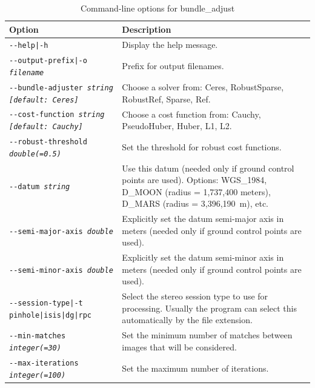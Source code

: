 \begin{longtable}{|l|p{7.5cm}|}
\caption{Command-line options for bundle\_adjust}
\label{tbl:bundleadjust}
\endfirsthead
\endhead
\endfoot
\endlastfoot
\hline
Option & Description \\ \hline \hline
\texttt{-\/-help|-h} & Display the help message. \\ \hline

\texttt{-\/-output-prefix|-o \textit{filename}} & Prefix for output filenames. \\ \hline

\texttt{-\/-bundle-adjuster \textit{string [default: Ceres]}} & Choose a solver from:
Ceres, RobustSparse, RobustRef, Sparse, Ref. \\ \hline

\texttt{-\/-cost-function \textit{string [default: Cauchy]}} & Choose a cost function
from: Cauchy, PseudoHuber, Huber, L1, L2. \\ \hline

\texttt{-\/-robust-threshold \textit{double(=0.5)}} & Set the threshold for robust
cost functions.\\ \hline

\texttt{-\/-datum \textit{string}} & Use this datum (needed only if ground control
points are used). Options: WGS\_1984, D\_MOON (radius = 1,737,400 meters), D\_MARS
(radius = 3,396,190~m), etc.  \\ \hline

\texttt{-\/-semi-major-axis \textit{double}} & Explicitly set the datum semi-major axis
in meters (needed only if ground control points are used).\\ \hline
\texttt{-\/-semi-minor-axis \textit{double}} & Explicitly set the datum semi-minor axis
in meters (needed only if ground control points are used).\\ \hline

\texttt{-\/-session-type|-t pinhole|isis|dg|rpc} & Select the stereo
session type to use for processing. Usually the program can select this
automatically by the file extension.\\ \hline

\texttt{-\/-min-matches \textit{integer(=30)}} & Set the minimum number of matches
between images that will be considered. \\ \hline

\texttt{-\/-max-iterations \textit{integer(=100)}} & Set the maximum
number of iterations. \\ \hline


\end{longtable}
